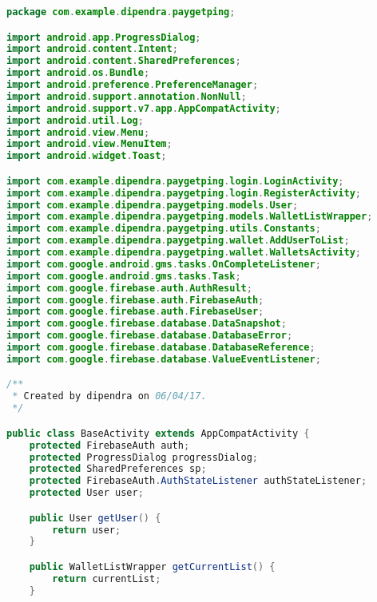 \documentclass{article}
\begin{document}
\begin{lstlisting}[language=Java]
package com.example.dipendra.paygetping;

import android.app.ProgressDialog;
import android.content.Intent;
import android.content.SharedPreferences;
import android.os.Bundle;
import android.preference.PreferenceManager;
import android.support.annotation.NonNull;
import android.support.v7.app.AppCompatActivity;
import android.util.Log;
import android.view.Menu;
import android.view.MenuItem;
import android.widget.Toast;

import com.example.dipendra.paygetping.login.LoginActivity;
import com.example.dipendra.paygetping.login.RegisterActivity;
import com.example.dipendra.paygetping.models.User;
import com.example.dipendra.paygetping.models.WalletListWrapper;
import com.example.dipendra.paygetping.utils.Constants;
import com.example.dipendra.paygetping.wallet.AddUserToList;
import com.example.dipendra.paygetping.wallet.WalletsActivity;
import com.google.android.gms.tasks.OnCompleteListener;
import com.google.android.gms.tasks.Task;
import com.google.firebase.auth.AuthResult;
import com.google.firebase.auth.FirebaseAuth;
import com.google.firebase.auth.FirebaseUser;
import com.google.firebase.database.DataSnapshot;
import com.google.firebase.database.DatabaseError;
import com.google.firebase.database.DatabaseReference;
import com.google.firebase.database.ValueEventListener;

/**
 * Created by dipendra on 06/04/17.
 */

public class BaseActivity extends AppCompatActivity {
    protected FirebaseAuth auth;
    protected ProgressDialog progressDialog;
    protected SharedPreferences sp;
    protected FirebaseAuth.AuthStateListener authStateListener;
    protected User user;

    public User getUser() {
        return user;
    }

    public WalletListWrapper getCurrentList() {
        return currentList;
    }


\end{lstlisting}
\end{document}
